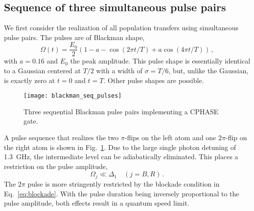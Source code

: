 \subsection{Sequence of three simultaneous pulse pairs}
\label{subsec:RydJZ}

We first consider the realization of all population transfers using simultaneous
pulse pairs. The pulses are of Blackman shape,
\begin{equation}
  \label{eq:blackman}
  \Omega(t) = \frac{E_0}{2}\left(1 - a - \cos\left(2\pi t/T\right)
  + a\cos\left(4\pi t/T\right)\right)\,,
\end{equation}
%
with $a = 0.16$ and $E_0$ the peak amplitude. This pulse shape is essentially
identical to a Gaussian centered at $T/2$ with a width of $\sigma = T/6$, but,
unlike the Gaussian, is exactly zero at $t=0$ and $t=T$. Other pulse shapes are
possible.

\begin{figure}[tb]
    \centering\texttt{[image: blackman\_seq\_pulses]}
  \caption{%
    Three sequential Blackman pulse pairs implementing a CPHASE gate.}
  \label{fig:jz_pulses}
\end{figure}
A pulse sequence that realizes the two $\pi$-flips on the left atom and one
$2\pi$-flip on the right atom is shown in Fig.~\ref{fig:jz_pulses}. Due to the
large single photon detuning of \SI{1.3}{GHz}, the intermediate level can be
adiabatically eliminated. This places a restriction on the pulse amplitude,
\begin{equation}
    \Omega_j \ll \Delta_1 \quad (j=B,R)\,.
\end{equation}
%
The $2\pi$ pulse is more stringently restricted by the blockade condition in
Eq.~\eqref{eq:blockade}. With the pulse duration being inversely proportional to
the pulse amplitude, both effects result in a quantum speed limit.


